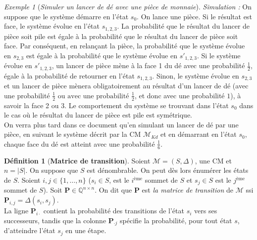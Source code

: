 \documentclass[12pt,a4paper]{report}
\theoremstyle{definition}%
\newtheorem{definition}{Définition}[chapter]
\theoremstyle{remark}
\newtheorem{example}{Exemple}[chapter]
\newcommand{\ssi}{ssi }
\begin{document}
\begin{example} [\textit{Simuler un lancer de dé avec une pièce de monnaie}]
	\textit{Simulation : }On suppose que le système démarre en l'état $s_0$. On lance une pièce. Si le résultat est face, le système évolue en l'état $s_{1, 2, 3}$. La probabilité que le résultat du lancer de pièce soit pile est égale à la probabilité que le résultat du lancer de pièce soit face. Par conséquent, en relançant la pièce, la probabilité que le système évolue en $s_{2, 3}$ est égale à la probabilité que le système évolue en $s'_{1, 2, 3}$. Si le système évolue en $s'_{1, 2, 3}$, un lancer de pièce mène à la face 1 du dé avec une probabilité $\frac{1}{2}$, égale à la probabilité de retourner en l'état $s_{1, 2, 3}$. Sinon, le système évolue en $s_{2, 3}$ et un lancer de pièce mènera obligatoirement au résultat d'un lancer de dé (avec une probabilité $\frac{1}{2} \text{ ou avec une probabilité }  \frac{1}{2}$, et donc avec une probabilité $1$), à savoir la face 2 ou 3. Le comportement du système se trouvant dans l'état $s_0$ dans le cas où le résultat du lancer de pièce est pile est symétrique.\\

	On verra plus tard dans ce document qu'en simulant un lancer de dé par une pièce, en suivant le système décrit par la CM $\mathcal{M}_{Kd}$ et en démarrant en l'état $s_0$, chaque face du dé est atteint avec une probabilité $\frac{1}{6}$.\\

\end{example}

\begin{definition}[\textbf{Matrice de transition}]
	Soient $\mathcal{M} = (S, \Delta)$, une CM et $n = |S|$. On suppose que $S$ est dénombrable. On peut dès lors énumérer les états de $S$. Soient $i,j \in \{1, \dots, n\}$ ($s_i \in S$, est le $i^{\text{ème}}$ sommet de $S$ et $s_j \in S$ est le $j^{\text{ème}}$ sommet de $S$). Soit \textbf{P}$\in \mathbb{Q}^{n \times n}$. On dit que
	\textbf{P} est \textit{la matrice de transition} de $\mathcal{M}$ \ssi $\textbf{P}_{i,j} = \Delta(s_i, s_j)$.\\
	La ligne $\textbf{P}_{i \cdot}$ contient la probabilité des transitions de l'état $s_i$ vers ses successeurs, tandis que la colonne $\textbf{P}_{\cdot j}$ spécifie la probabilité, pour tout état $s$, d'atteindre l'état $s_j$ en une étape.
\end{definition}
\end{document}
